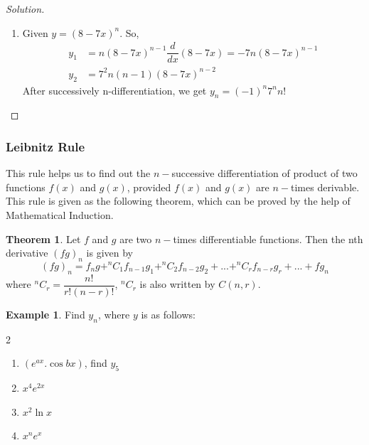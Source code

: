 \documentclass[../../main.tex]{subfiles}
\theoremstyle{definition}
\newtheorem{theorem}{Theorem}[section]
\newtheorem{example}{Example}[section]
\newenvironment{solution}
    {\begin{proof}[Solution]}
    {\end{proof}}
\begin{document}
\begin{solution}
\begin{enumerate}[label=(\roman*)]
\item Given $y=(8-7x)^n$. So,
\begin{align*}
    y_1&=n(8-7x)^{n-1}\dfrac{d}{dx}(8-7x)=-7n(8-7x)^{n-1} \\
    y_2&=7^2n(n-1)(8-7x)^{n-2}
\end{align*}
After successively n-differentiation, we get $y_n=(-1)^n7^nn!$
\end{enumerate}
\end{solution}


\subsubsection{Leibnitz Rule}

This rule helps us to find out the $n-$successive differentiation of product of two functions $f(x)$ and $g(x)$, provided  $f(x)$ and $g(x)$ are 
$n-$times derivable. This rule is given as the following theorem, which can be proved by the help of Mathematical Induction.

\begin{theorem}
Let $f$ and $g$ are two $n-$times differentiable functions. Then the nth derivative $(fg)_n$ is given by
\[
(fg)_n=f_ng+^nC_1f_{n-1}g_1+^nC_2f_{n-2}g_2+...+^nC_rf_{n-r}g_r+...+fg_n
\]
where $^nC_r= \dfrac{n!}{r!(n-r)!}$, $^nC_r$ is also written by $C(n,r)$.    
\end{theorem}

\begin{example}
Find $y_n$, where $y$ is as follows:
\begin{multicols}{2}
\begin{enumerate}[label=(\roman*)]
    \item $(e^{ax}.\cos bx)$, find $y_5$
    \item $x^4e^{2x}$
    \item ${x^2\ln x}$
    \item $x^ne^x$ 
\end{enumerate}
\end{multicols}    
\end{example}
\end{document}
